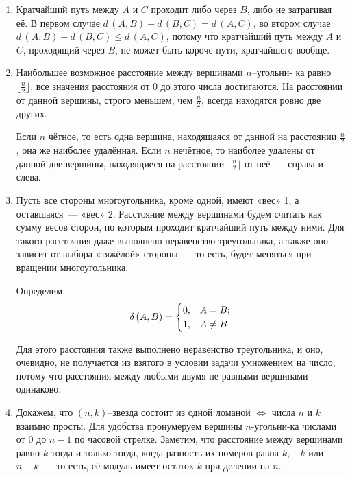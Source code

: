 \def\vfi{\varphi}
\def\gcd{\text{НОД}\,}

\begin{enumerate}

	\item Кратчайший путь между $A$ и $C$ проходит либо через $B$, либо не затрагивая её. В первом случае $d\,(A,B) + d\,(B,C) = d\,(A,C)$, во втором случае $d\,(A,B) + d\,(B,C) \le d\,(A,C)$, потому что кратчайший путь между $A$ и $C$, проходящий через $B$, не может быть короче пути, кратчайшего вообще.

	\item Наибольшее возможное расстояние между вершинами $n$--угольни- ка равно $\lfloor \tfrac{n}{2} \rfloor$, все значения расстояния от 0 до этого числа достигаются. На расстоянии от данной вершины, строго меньшем, чем $\tfrac{n}{2}$, всегда находятся ровно две других.
	
	Если $n$ чётное, то есть одна вершина, находящаяся от данной на расстоянии $\tfrac{n}{2}$, она же наиболее удалённая. Если $n$ нечётное, то наиболее удалены от данной две вершины, находящиеся на расстоянии $\lfloor \tfrac{n}{2} \rfloor$ от неё~— справа и слева.

	\item Пусть все стороны многоугольника, кроме одной, имеют «вес» 1, а оставшаяся~— «вес» 2. Расстояние между вершинами будем считать как сумму весов сторон, по которым проходит кратчайший путь между ними. Для такого расстояния даже выполнено неравенство треугольника, а также оно зависит от выбора «тяжёлой» стороны~— то есть, будет меняться при вращении многоугольника.

	Определим
	$$\delta\,(A,B) = \begin{cases} 0, & A=B\scolon\\ 1, & A \ne B \end{cases}$$

	Для этого расстояния также выполнено неравенство треугольника, и оно, очевидно, не получается из взятого в условии задачи умножением на число, потому что расстояния между любыми двумя не равными вершинами одинаково.

\item Докажем, что $(n,k)$--звезда состоит из одной ломаной $\Longleftrightarrow$ числа $n$ и $k$ взаимно просты. Для удобства пронумеруем вершины $n$-угольни-ка числами от $0$ до $n-1$ по часовой стрелке. Заметим, что расстояние между вершинами равно $k$ тогда и только тогда, когда разность их номеров равна $k$, $-k$ или $n-k$~— то есть, её модуль имеет остаток $k$ при делении на $n$.


\end{enumerate}
